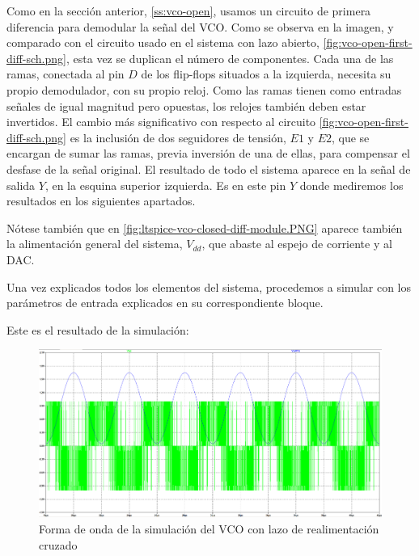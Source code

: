 \documentclass[12pt]{report} %
\begin{document}
	Como en la sección anterior, \ref{ss:vco-open}, usamos un circuito de primera diferencia para demodular la señal del VCO. Como se observa en la imagen, y comparado con el circuito usado en el sistema con lazo abierto, \ref{fig:vco-open-first-diff-sch.png}, esta vez se duplican el número de componentes. Cada una de las ramas, conectada al pin $D$ de los flip-flops situados a la izquierda, necesita su propio demodulador, con su propio reloj. Como las ramas tienen como entradas señales de igual magnitud pero opuestas, los relojes también deben estar invertidos. El cambio más significativo con respecto al circuito \ref{fig:vco-open-first-diff-sch.png} es la inclusión de dos seguidores de tensión, $E1$ y $E2$, que se encargan de sumar las ramas, previa inversión de una de ellas, para compensar el desfase de la señal original. El resultado de todo el sistema aparece en la señal de salida $Y$, en la esquina superior izquierda. Es en este pin $Y$ donde mediremos los resultados en los siguientes apartados.
	
	Nótese también que en \ref{fig:ltspice-vco-closed-diff-module.PNG} aparece también la alimentación general del sistema, $V_{dd}$, que abaste al espejo de corriente y al DAC.
	
	
	Una vez explicados todos los elementos del sistema, procedemos a simular con los parámetros de entrada explicados en su correspondiente bloque.
	
	Este es el resultado de la simulación:
	
	\begin{figure}[H]
		\includegraphics[width=\textwidth]{sim-vco-closed-waveform-dem.png}
		\caption[Forma de onda de la simulación del VCO con lazo de realimentación cruzado]{Forma de onda de la simulación del VCO con lazo de realimentación cruzado}
		\label{fig:sim-vco-closed-waveform-dem.png}
	\end{figure}
\end{document}
